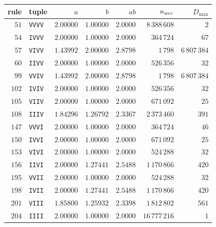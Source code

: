 \begin{tabular}{rlrrrrr}
\hline
rule & tuple & $a$ & $b$ & $ab$ & $n_{\rm wcc}$ & $D_{\max}$ \\
\hline
$51$ & \texttt{VVVV} & $2.00000$ & $1.00000$ & $2.0000$ & $8\,388\,608$ & $2$ \\
$54$ & \texttt{IVVV} & $2.00000$ & $1.00000$ & $2.0000$ & $364\,724$ & $67$ \\
$57$ & \texttt{VIVV} & $1.43992$ & $2.00000$ & $2.8798$ & $1\,798$ & $6\,807\,384$ \\
$60$ & \texttt{IIVV} & $2.00000$ & $1.00000$ & $2.0000$ & $526\,356$ & $32$ \\
$99$ & \texttt{VVIV} & $1.43992$ & $2.00000$ & $2.8798$ & $1\,798$ & $6\,807\,384$ \\
$102$ & \texttt{IVIV} & $2.00000$ & $1.00000$ & $2.0000$ & $526\,356$ & $32$ \\
$105$ & \texttt{VIIV} & $2.00000$ & $1.00000$ & $2.0000$ & $671\,092$ & $25$ \\
$108$ & \texttt{IIIV} & $1.84296$ & $1.26792$ & $2.3367$ & $2\,373\,460$ & $391$ \\
$147$ & \texttt{VVVI} & $2.00000$ & $1.00000$ & $2.0000$ & $364\,724$ & $46$ \\
$150$ & \texttt{IVVI} & $2.00000$ & $1.00000$ & $2.0000$ & $671\,092$ & $25$ \\
$153$ & \texttt{VIVI} & $2.00000$ & $1.00000$ & $2.0000$ & $524\,288$ & $32$ \\
$156$ & \texttt{IIVI} & $2.00000$ & $1.27441$ & $2.5488$ & $1\,170\,866$ & $420$ \\
$195$ & \texttt{VVII} & $2.00000$ & $1.00000$ & $2.0000$ & $524\,288$ & $32$ \\
$198$ & \texttt{IVII} & $2.00000$ & $1.27441$ & $2.5488$ & $1\,170\,866$ & $420$ \\
$201$ & \texttt{VIII} & $1.85800$ & $1.25932$ & $2.3398$ & $1\,812\,802$ & $561$ \\
$204$ & \texttt{IIII} & $2.00000$ & $1.00000$ & $2.0000$ & $16\,777\,216$ & $1$ \\
\hline
\end{tabular}
